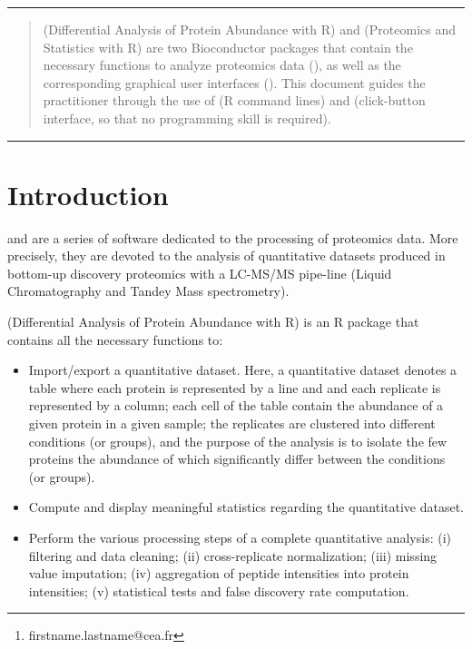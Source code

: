 \documentclass[12pt]{article}
\author{
Samuel Wieczorek\footnote{firstname.lastname@cea.fr} ,
Florence Combes$^\ast$,
Cosmin Lazar,
Quentin Giai Gianetto,\\
Laurent Gatto,
Alexia Dorffer,
Anne-Marie Hesse,
Yohann Coute,\\
Myriam Ferro,
Christophe Bruley
and Thomas Burger$^\ast$
}
\begin{document}


\maketitle



\hrule
\begin{abstract}
 (Differential Analysis of Protein Abundance with R) and 
 (Proteomics and Statistics with R) are two Bioconductor 
packages that contain the necessary functions to analyze proteomics data 
(), as well as the corresponding graphical user interfaces 
(). This document guides the practitioner through the use of
 (R command lines) and  (click-button 
interface, so that no programming skill is required).
\end{abstract}
\hrule
{}

\newpage
\tableofcontents
\newpage

\section{Introduction}\label{sec:intro}



 and  are a series of software dedicated to 
the processing of proteomics data. More precisely, they are devoted to the 
analysis of quantitative datasets produced in bottom-up discovery proteomics 
with a LC-MS/MS pipe-line (Liquid Chromatography and Tandey Mass 
spectrometry).\newline

 (Differential Analysis of Protein Abundance with R) is an R 
package that contains all the necessary functions to:
\begin{itemize}
\item {Import/export a quantitative dataset.} Here, a quantitative dataset 
denotes a table where each protein is represented by a line and and each 
replicate is represented by a column; each cell of the table contain the 
abundance of a given protein in a given sample; the replicates are clustered 
into different conditions (or groups), and the purpose of the analysis is to 
isolate the few proteins the abundance of which significantly differ between 
the conditions (or groups).
\item {Compute and display meaningful statistics regarding the quantitative 
dataset.}
\item {Perform the various processing steps of a complete quantitative 
analysis}: (i) filtering and data cleaning; (ii) cross-replicate 
normalization; (iii) missing value imputation; {(iv) aggregation of peptide 
intensities into protein intensities;} (v) statistical tests and false 
discovery rate computation.
\end{itemize}
\end{document}
